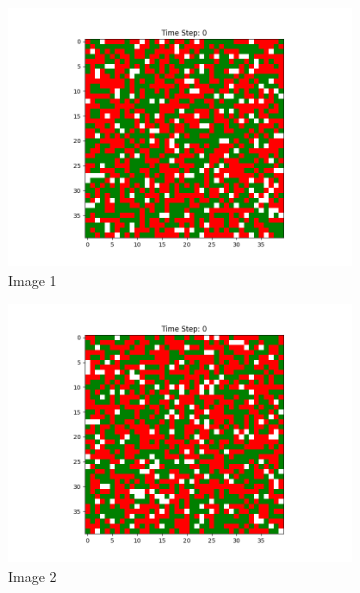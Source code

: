 \documentclass[12pt]{article}
\begin{document}
\begin{figure}[h]
\begin{subfigure}{0.2\textwidth}
			\includegraphics[width=\linewidth]{initial_social_n10p3.png}				\caption{Image 1}
		\end{subfigure}\hspace{0.02\textwidth}
		\begin{subfigure}{0.2\textwidth}
			\includegraphics[width=\linewidth]{initial_social_n10p5.png}				\caption{Image 2}
		\end{subfigure}\hspace{0.02\textwidth}
		\begin{subfigure}{0.2\textwidth}

\end{subfigure}
\end{figure}
\end{document}
